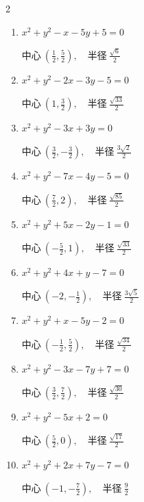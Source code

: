 \begin{multicols}{2}
\begin{enumerate}
  \item $x^{2}+y^{2}-x-5y+5=0$

        $\displaystyle 中心\: \left(\frac{1}{2},\frac{5}{2}\right), \quad 半径 \ \frac{\sqrt{6}}{2}$

  \item $x^{2}+y^{2}-2x-3y-5=0$

        $\displaystyle 中心\: \left(1,\frac{3}{2}\right), \quad 半径 \ \frac{\sqrt{33}}{2}$

  \item $x^{2}+y^{2}-3x+3y=0$

        $\displaystyle 中心\: \left(\frac{3}{2},-\frac{3}{2}\right), \quad 半径 \ \frac{3\sqrt{2}}{2}$

  \item $x^{2}+y^{2}-7x-4y-5=0$

        $\displaystyle 中心\: \left(\frac{7}{2},2\right), \quad 半径 \ \frac{\sqrt{85}}{2}$

  \item $x^{2}+y^{2}+5x-2y-1=0$

        $\displaystyle 中心\: \left(-\frac{5}{2},1\right), \quad 半径 \ \frac{\sqrt{33}}{2}$

  \item $x^{2}+y^{2}+4x+y-7=0$

        $\displaystyle 中心\: \left(-2,-\frac{1}{2}\right), \quad 半径 \ \frac{3\sqrt{5}}{2}$

  \item $x^{2}+y^{2}+x-5y-2=0$

        $\displaystyle 中心\: \left(-\frac{1}{2},\frac{5}{2}\right), \quad 半径 \ \frac{\sqrt{34}}{2}$

\columnbreak %

\resetques

  \item $x^{2}+y^{2}-3x-7y+7=0$

        $\displaystyle 中心\: \left(\frac{3}{2},\frac{7}{2}\right), \quad 半径 \ \frac{\sqrt{30}}{2}$

  \item $x^{2}+y^{2}-5x+2=0$

        $\displaystyle 中心\: \left(\frac{5}{2},0\right), \quad 半径 \ \frac{\sqrt{17}}{2}$

  \item $x^{2}+y^{2}+2x+7y-7=0$

        $\displaystyle 中心\: \left(-1,-\frac{7}{2}\right), \quad 半径 \ \frac{9}{2}$


\end{enumerate}
\end{multicols}
